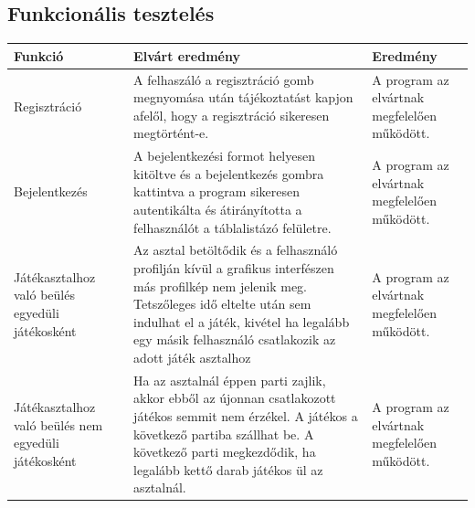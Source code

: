 \subsection{Funkcionális tesztelés}
\begin{tabular}{| C{4.7cm} | C{4.7cm} | C{4.7cm} |}
\hline
  Funkció & Elvárt eredmény & Eredmény \\ \hline
  Regisztráció & A felhaszáló a regisztráció gomb megnyomása után tájékoztatást kapjon afelől, hogy a regisztráció sikeresen megtörtént-e. & A program az elvártnak megfelelően működött. \\ \hline
  Bejelentkezés & A bejelentkezési formot helyesen kitöltve és a bejelentkezés gombra kattintva a program sikeresen autentikálta és átirányította a felhasználót a táblalistázó felületre. & A program az elvártnak megfelelően működött.  \\ \hline
  Játékasztalhoz való beülés egyedüli játékosként & Az asztal betöltődik és a felhasználó profilján kívül a grafikus interfészen más profilkép nem jelenik meg. Tetszőleges idő eltelte után sem indulhat el a játék, kivétel ha legalább egy másik felhasználó csatlakozik az adott játék asztalhoz  & A program az elvártnak megfelelően működött. \\ \hline
  Játékasztalhoz való beülés nem egyedüli játékosként & Ha az asztalnál éppen parti zajlik, akkor ebből az újonnan csatlakozott játékos semmit nem érzékel. A játékos a következő partiba szállhat be. A következő parti megkezdődik, ha legalább kettő darab játékos ül az asztalnál. & A program az elvártnak megfelelően működött. \\ \hline
\end{tabular}

